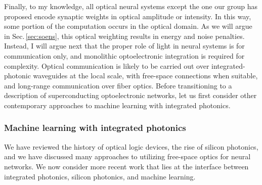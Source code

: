 Finally, to my knowledge, all optical neural systems except the one our group has proposed encode synaptic weights in optical amplitude or intensity. In this way, some portion of the computation occurs in the optical domain. As we will argue in Sec.\,\ref{sec:soens}, this optical weighting results in energy and noise penalties. Instead, I will argue next that the proper role of light in neural systems is for communication only, and monolithic optoelectronic integration is required for complexity. Optical communication is likely to be carried out over integrated-photonic waveguides at the local scale, with free-space connections when suitable, and long-range communication over fiber optics. Before transitioning to a description of superconducting optoelectronic networks, let us first consider other contemporary approaches to machine learning with integrated photonics.


\subsubsection{Machine learning with integrated photonics}
We have reviewed the history of optical logic devices, the rise of silicon photonics, and we have discussed many approaches to utilizing free-space optics for neural networks. We now consider more recent work that lies at the interface between integrated photonics, silicon photonics, and machine learning. 


